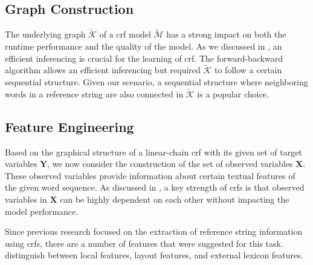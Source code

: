 \subsection{Graph Construction}\label{subsec:ae-graph-construction}

The underlying graph $\mathcal{\tilde{K}}$ of a \gls{crf} model $\mathcal{\tilde{M}}$ has a strong impact on both the runtime performance and the quality of the model.
As we discussed in , an efficient inferencing is crucial for the learning of \gls{crf}.
The forward-backward algorithm allows an efficient inferencing but required $\mathcal{\tilde{K}}$ to follow a certain sequential structure.
Given our scenario, a sequential structure where neighboring words in a reference string are also connected in $\mathcal{\tilde{K}}$ is a popular choice.



\subsection{Feature Engineering}\label{subsec:ae-fearture-engineering}

Based on the graphical structure of a \gls{linear-chain crf} with its given set of \glspl{target variable} $\mathbf{Y}$, we now consider the construction of the set of \glspl{observed variable} $\mathbf{X}$.
These \glspl{observed variable} provide information about certain textual features of the given word sequence.
As discussed in , a key strength of \glspl{crf} is that \glspl{observed variable} in $\mathbf{X}$ can be highly dependent on each other without impacting the model performance.


Since previous research focused on the extraction of reference string information using \glspl{crf}, there are a number of features that were suggested for this task.
\citet{peng2004accurate} distinguish between local features, layout features, and external lexicon features.



